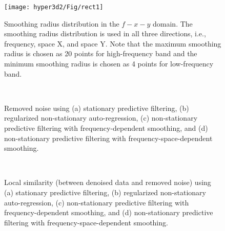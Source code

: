 \begin{figure}[htb!]
\centering
\texttt{[image: hyper3d2/Fig/rect1]}
\caption{Smoothing radius distribution in the $f-x-y$ domain. The smoothing radius distribution is used in all three directions, i.e., frequency, space X, and space Y. Note that the maximum smoothing radius is chosen as 20 points for high-frequency band and the minimum smoothing radius is chosen as 4 points for low-frequency band. }
\label{fig:rect1}
\end{figure}

\begin{figure}[htb!]
\centering
{}
\\
\caption{Removed noise using (a) stationary predictive filtering, (b) regularized non-stationary auto-regression, (c) non-stationary predictive filtering with frequency-dependent smoothing, and (d) non-stationary predictive filtering with frequency-space-dependent smoothing.}
\label{fig:test2dif-0,test1dif-0,test0dif-0,test00dif-0}
\end{figure}


\begin{figure}[htb!]
\centering
{}
\\
\caption{Local similarity (between denoised data and removed noise) using (a) stationary predictive filtering, (b) regularized non-stationary auto-regression, (c) non-stationary predictive filtering with frequency-dependent smoothing, and (d) non-stationary predictive filtering with frequency-space-dependent smoothing.}
\label{fig:simi2,simi1,simi0,simi00}
\end{figure}


